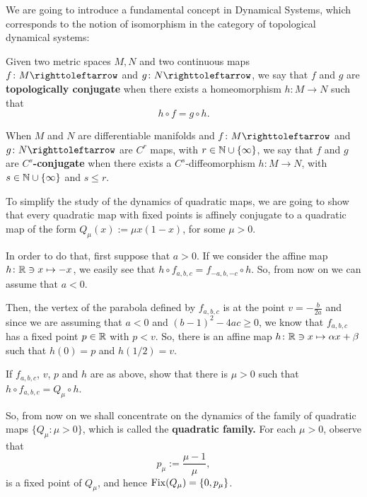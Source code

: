 We are going to introduce a fundamental concept in Dynamical Systems, which corresponds to the notion of isomorphism in the category of topological dynamical systems:

\begin{definition}[Conjugacy]
  Given two metric spaces $M,N$ and two continuous maps $f\colon M\carr$ and $g\colon N\carr$, we say that $f$ and $g$ are \textbf{topologically conjugate} when there exists a homeomorphism $h\colon M\to N$ such that
  \begin{displaymath}
    h\circ f = g\circ h.
  \end{displaymath}

  When $M$ and $N$ are differentiable manifolds and $f\colon M\carr$ and $g\colon N\carr$ are $C^r$ maps, with $r\in\mathbb{N}\cup\{\infty\}$, we say that $f$ and $g$ are \textbf{$C^s$-conjugate} when there exists a $C^s$-diffeomorphism $h\colon M\to N$, with $s\in\mathbb{N}\cup\{\infty\}$ and $s\leq r$.
\end{definition}

To simplify the study of the dynamics of quadratic maps, we are going to show that every quadratic map with fixed points is affinely conjugate to a quadratic map of the form $Q_\mu(x):=\mu x(1-x)$, for some $\mu>0$.

In order to do that, first suppose that $a>0$. If we consider the affine map $h\colon \mathbb{R}\ni x\mapsto -x$, we easily see that $h\circ f_{a,b,c}=f_{-a,b,-c}\circ h$. So, from now on we can assume that $a<0$.

Then, the vertex of the parabola defined by $f_{a,b,c}$ is at the point $v=-\frac{b}{2a}$ and since we are assuming that $a<0$ and $(b-1)^2-4ac\geq 0$, we know that $f_{a,b,c}$ has a fixed point $p\in\mathbb{R}$ with $p<v$. So, there is an affine map $h\colon\mathbb{R}\ni x\mapsto \alpha x + \beta$ such that $h(0)=p$ and $h(1/2)=v$.

\begin{problem}
  If $f_{a,b,c}$, $v$, $p$ and $h$ are as above, show that there is $\mu>0$ such that $h\circ f_{a,b,c}=Q_\mu\circ h$.
\end{problem}

So, from now on we shall concentrate on the dynamics of the family of quadratic maps $\{Q_\mu : \mu>0\}$, which is called the \textbf{quadratic family.} For each $\mu>0$, observe that
\begin{displaymath}
  p_\mu:=\frac{\mu-1}{\mu},
\end{displaymath}
is a fixed point of $Q_\mu$, and hence $\operatorname{Fix}(Q_\mu)=\{0,p_\mu\}$.

